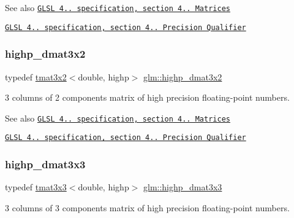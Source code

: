 \begin{DoxySeeAlso}{See also}
\href{http://www.opengl.org/registry/doc/GLSLangSpec.4.20.8.pdf}{\tt G\+L\+SL 4.. specification, section 4.. Matrices} 

\href{http://www.opengl.org/registry/doc/GLSLangSpec.4.20.8.pdf}{\tt G\+L\+SL 4.. specification, section 4.. Precision Qualifier} 
\end{DoxySeeAlso}
\mbox{\label{group__core__precision_gafe7ef85b0bc26e754cbf83fed54bf106}} 
\subsubsection{\texorpdfstring{highp\+\_\+dmat3x2}{highp\_dmat3x2}}
{\footnotesize\ttfamily typedef \hyperlink{structglm_1_1tmat3x2}{tmat3x2}$<$double, highp$>$ \hyperlink{group__core__precision_gafe7ef85b0bc26e754cbf83fed54bf106}{glm\+::highp\+\_\+dmat3x2}}

3 columns of 2 components matrix of high precision floating-\/point numbers.

\begin{DoxySeeAlso}{See also}
\href{http://www.opengl.org/registry/doc/GLSLangSpec.4.20.8.pdf}{\tt G\+L\+SL 4.. specification, section 4.. Matrices} 

\href{http://www.opengl.org/registry/doc/GLSLangSpec.4.20.8.pdf}{\tt G\+L\+SL 4.. specification, section 4.. Precision Qualifier} 
\end{DoxySeeAlso}
\mbox{\label{group__core__precision_ga604f966e7bf042f298beb3b262287970}} 
\subsubsection{\texorpdfstring{highp\+\_\+dmat3x3}{highp\_dmat3x3}}
{\footnotesize\ttfamily typedef \hyperlink{structglm_1_1tmat3x3}{tmat3x3}$<$double, highp$>$ \hyperlink{group__core__precision_ga604f966e7bf042f298beb3b262287970}{glm\+::highp\+\_\+dmat3x3}}

3 columns of 3 components matrix of high precision floating-\/point numbers.

